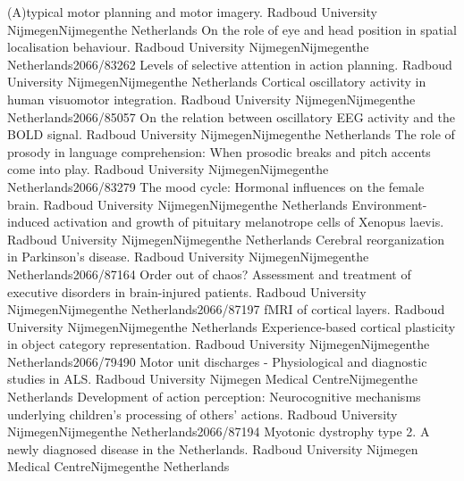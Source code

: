 	{(A)typical motor planning and motor imagery.}
	{Radboud University Nijmegen}{Nijmegen}{the Netherlands}{}
	{On the role of eye and head position in spatial localisation behaviour.}
	{Radboud University Nijmegen}{Nijmegen}{the Netherlands}{2066/83262}
	{Levels of selective attention in action planning.}
	{Radboud University Nijmegen}{Nijmegen}{the Netherlands}{}
	{Cortical oscillatory activity in human visuomotor integration.}
	{Radboud University Nijmegen}{Nijmegen}{the Netherlands}{2066/85057}
	{On the relation between oscillatory EEG activity and the BOLD signal.}
	{Radboud University Nijmegen}{Nijmegen}{the Netherlands}{}
	{The role of prosody in language comprehension: When prosodic breaks and pitch accents come into play.}
	{Radboud University Nijmegen}{Nijmegen}{the Netherlands}{2066/83279}
	{The mood cycle: Hormonal influences on the female brain.}
	{Radboud University Nijmegen}{Nijmegen}{the Netherlands}{}
	{Environment-induced activation and growth of pituitary melanotrope cells of Xenopus laevis.}
	{Radboud University Nijmegen}{Nijmegen}{the Netherlands}{}
	{Cerebral reorganization in Parkinson’s disease.}
	{Radboud University Nijmegen}{Nijmegen}{the Netherlands}{2066/87164}
	{Order out of chaos? Assessment and treatment of executive disorders in brain-injured patients.}
	{Radboud University Nijmegen}{Nijmegen}{the Netherlands}{2066/87197}
	{fMRI of cortical layers.}
	{Radboud University Nijmegen}{Nijmegen}{the Netherlands}{}
	{Experience-based cortical plasticity in object category representation.}
	{Radboud University Nijmegen}{Nijmegen}{the Netherlands}{2066/79490}
	{Motor unit discharges - Physiological and diagnostic studies in ALS.}
	{Radboud University Nijmegen Medical Centre}{Nijmegen}{the Netherlands}{}
	{Development of action perception: Neurocognitive mechanisms underlying children’s processing of others’ actions.}
	{Radboud University Nijmegen}{Nijmegen}{the Netherlands}{2066/87194}
	{Myotonic dystrophy type 2. A newly diagnosed disease in the Netherlands.}
	{Radboud University Nijmegen Medical Centre}{Nijmegen}{the Netherlands}{}
